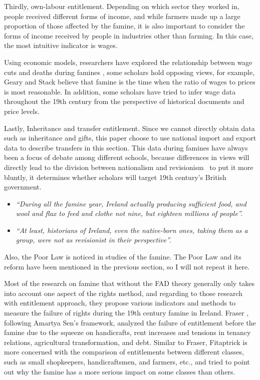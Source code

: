 Thirdly, own-labour entitlement. Depending on which sector they worked in, people received different forms of income, and while farmers made up a large proportion of those affected by the famine, it is also important to consider the forms of income received by people in industries other than farming. In this case, the most intuitive indicator is wages.

Using economic models, researchers have explored the relationship between wage cuts and deaths during famines
\citep{o1994economic}, some scholars hold opposing views, for example, Geary and Stack \citep{geary2004trends} believe that famine is the time when the ratio of wages to prices is most reasonable. In addition, some scholars \citep{guinnane1994great} have tried to infer wage data throughout the 19th century from the perspective of historical documents and price levels.

Lastly, Inheritance and transfer entitlement. Since we cannot directly obtain data such as inheritance and gifts, this paper choose to use national import and export data to describe transfers in this section. This data during famines have always been a focus of debate among different schools, because differences in views will directly lead to the division between nationalism and revisionism \textemdash\ to put it more bluntly, it determines whether scholars will target 19th century's British government. 

\begin{itemize}
    \item [] \textit{``During all the famine year, Ireland actually producing sufficient food, and wool and flax to feed and clothe not nine, but eighteen millions of people''.} \citep{mitchel1905apology}
    \item [] \textit{``At least, historians of Ireland, even the native-born ones, taking them as a group, were not as revisionist in their perspective''.}\citep{donnelly1996construction}
\end{itemize}

Also, the Poor Law is noticed in studies of the famine. The Poor Law and its reform have been mentioned in the previous section, so I will not repeat it here.

Most of the research on famine that without the FAD theory generally only takes into account one aspect of the rights method, and regarding to those research with entitlement approach, they propose various indicators and methods to measure the failure of rights during the 19th century famine in Ireland. Fraser \citep{fraser2003social}, following Amartya Sen's framework, analyzed the failure of entitlement before the famine due to the squeeze on handicrafts, rent increases and tensions in tenancy relations, agricultural transformation, and debt. Similar to Fraser, Fitaptrick \citep{fitzpatrick1995famine}  is more concerned with the comparison of entitlements between different classes, such as small shopkeepers, handicraftsmen, and farmers, etc., and tried to point out why the famine has a more serious impact on some classes than others.

